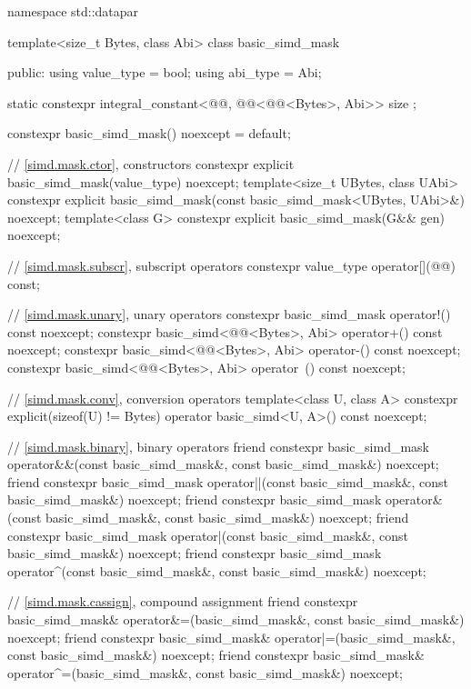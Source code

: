 \begin{codeblock}
namespace std::datapar {
  template<size_t Bytes, class Abi> class basic_simd_mask {
  public:
    using value_type = bool;
    using abi_type = Abi;

    static constexpr integral_constant<@@, @@<@@<Bytes>, Abi>>
      size {};

    constexpr basic_simd_mask() noexcept = default;

    // \ref{simd.mask.ctor},  constructors
    constexpr explicit basic_simd_mask(value_type) noexcept;
    template<size_t UBytes, class UAbi>
      constexpr explicit basic_simd_mask(const basic_simd_mask<UBytes, UAbi>&) noexcept;
    template<class G> constexpr explicit basic_simd_mask(G&& gen) noexcept;

    // \ref{simd.mask.subscr},  subscript operators
    constexpr value_type operator[](@@) const;

    // \ref{simd.mask.unary},  unary operators
    constexpr basic_simd_mask operator!() const noexcept;
    constexpr basic_simd<@@<Bytes>, Abi> operator+() const noexcept;
    constexpr basic_simd<@@<Bytes>, Abi> operator-() const noexcept;
    constexpr basic_simd<@@<Bytes>, Abi> operator~() const noexcept;

    // \ref{simd.mask.conv},  conversion operators
    template<class U, class A>
      constexpr explicit(sizeof(U) != Bytes) operator basic_simd<U, A>() const noexcept;

    // \ref{simd.mask.binary},  binary operators
    friend constexpr basic_simd_mask
      operator&&(const basic_simd_mask&, const basic_simd_mask&) noexcept;
    friend constexpr basic_simd_mask
      operator||(const basic_simd_mask&, const basic_simd_mask&) noexcept;
    friend constexpr basic_simd_mask
      operator&(const basic_simd_mask&, const basic_simd_mask&) noexcept;
    friend constexpr basic_simd_mask
      operator|(const basic_simd_mask&, const basic_simd_mask&) noexcept;
    friend constexpr basic_simd_mask
      operator^(const basic_simd_mask&, const basic_simd_mask&) noexcept;

    // \ref{simd.mask.cassign},  compound assignment
    friend constexpr basic_simd_mask&
      operator&=(basic_simd_mask&, const basic_simd_mask&) noexcept;
    friend constexpr basic_simd_mask&
      operator|=(basic_simd_mask&, const basic_simd_mask&) noexcept;
    friend constexpr basic_simd_mask&
      operator^=(basic_simd_mask&, const basic_simd_mask&) noexcept;

}}
\end{codeblock}
